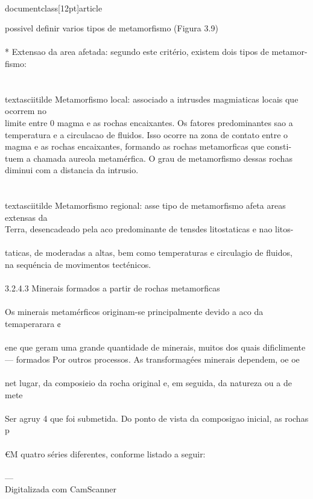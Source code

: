 \\documentclass[12pt]{article}
\begin{document}
possivel definir varios tipos de metamorfismo (Figura 3.9)\\
\\
* Extensao da area afetada: segundo este critério, existem dois tipos de metamor-\\
fismo:\\
\\
\\textasciitilde{} Metamorfismo local: associado a intrusdes magmiaticas locais que ocorrem no\\
limite entre 0 magma e as rochas encaixantes. Os fatores predominantes sao a\\
temperatura e a circulacao de fluidos. Isso ocorre na zona de contato entre o\\
magma e as rochas encaixantes, formando as rochas metamorficas que consti-\\
tuem a chamada aureola metamérfica. O grau de metamorfismo dessas rochas\\
diminui com a distancia da intrusio.\\
\\
\\textasciitilde{} Metamorfismo regional: asse tipo de metamorfismo afeta areas extensas da\\
Terra, desencadeado pela aco predominante de tensdes litostaticas e nao litos-\\
\\
taticas, de moderadas a altas, bem como temperaturas e circulagio de fluidos,\\
na sequéncia de movimentos tecténicos.\\
\\
3.2.4.3 Minerais formados a partir de rochas metamorficas\\
\\
Os minerais metamérficos originam-se principalmente devido a aco da temaperarara ¢\\
\\
ene que geram uma grande quantidade de minerais, muitos dos quais dificlimente\\
— formados Por outros processos. As transformagées minerais dependem, oe oe\\
\\
net lugar, da composi¢io da rocha original e, em seguida, da natureza ou a de mete\\
\\
Ser agruy 4 que foi submetida. Do ponto de vista da composigao inicial, as rochas p\\
\\
€M quatro séries diferentes, conforme listado a seguir:\\
\\
—\\
Digitalizada com CamScanner\\
\end{document}
